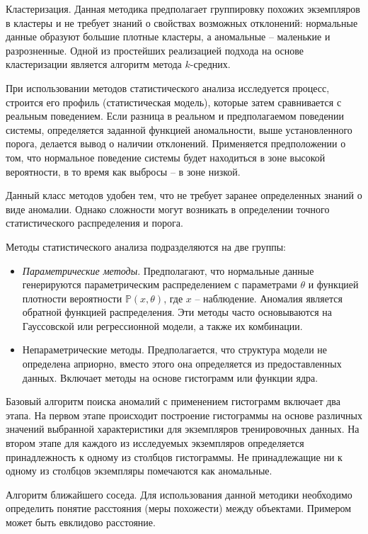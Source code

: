 \documentclass[%
	11pt,
	a4paper,
	utf8,
		]{article}
\begin{document}
Кластеризация. Данная методика предполагает группировку похожих экземпляров в кластеры и не требует знаний о свойствах возможных отклонений: нормальные данные образуют большие плотные кластеры, а аномальные -- маленькие и разрозненные. Одной из простейших реализацией подхода на основе кластеризации является алгоритм метода $ k $-средних.

При использовании методов статистического анализа исследуется процесс, строится его профиль (статистическая модель), которые затем сравнивается с реальным поведением. Если разница в реальном и предполагаемом поведении системы, определяется заданной функцией аномальности, выше установленного порога, делается вывод о наличии отклонений. Применяется предположении о том, что нормальное поведение системы будет находиться в зоне высокой вероятности, в то время как выбросы -- в зоне низкой.

Данный класс методов удобен тем, что не требует заранее определенных знаний о виде аномалии. Однако сложности могут возникать в определении точного статистического распределения и порога.

Методы статистического анализа подразделяются на две группы:
\begin{itemize}
	\item \emph{Параметрические методы}. Предполагают, что нормальные данные генерируются параметрическим распределением с параметрами $ \theta $ и функцией плотности вероятности $ \mathbb{P}(x, \theta) $, где $ x $ -- наблюдение. Аномалия является обратной функцией распределения. Эти методы часто основываются на Гауссовской или регрессионной модели, а также их комбинации.
	
	\item Непараметрические методы. Предполагается, что структура модели не определена априорно, вместо этого она определяется из предоставленных данных. Включает методы на основе гистограмм или функции ядра.
\end{itemize}

Базовый алгоритм поиска аномалий с применением гистограмм включает два этапа. На первом этапе происходит построение гистограммы на основе различных значений выбранной характеристики для экземпляров тренировочных данных. На втором этапе для каждого из исследуемых экземпляров определяется принадлежность к одному из столбцов гистограммы. Не принадлежащие ни к одному из столбцов экземпляры помечаются как аномальные.

Алгоритм ближайшего соседа. Для использования данной методики необходимо определить понятие расстояния (меры похожести) между объектами. Примером может быть евклидово расстояние.
\end{document}
